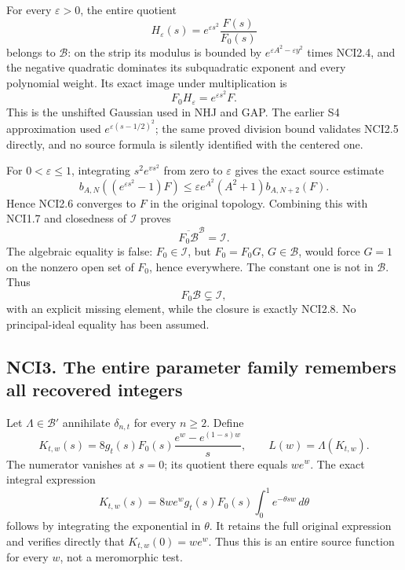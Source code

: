 For every \(\varepsilon>0\), the entire quotient \[
H_\varepsilon(s)=e^{\varepsilon s^2}\frac{F(s)}{F_0(s)}
\tag{NCI2.5}
\] belongs to \(\mathcal B\): on the strip its modulus is bounded by
\(e^{\varepsilon A^2-\varepsilon y^2}\) times NCI2.4, and the negative
quadratic dominates its subquadratic exponent and every polynomial
weight. Its exact image under multiplication is \[
F_0H_\varepsilon=e^{\varepsilon s^2}F.
\tag{NCI2.6}
\] This is the unshifted Gaussian used in NHJ and GAP. The earlier S4
approximation used \(e^{\varepsilon(s-1/2)^2}\); the same proved
division bound validates NCI2.5 directly, and no source formula is
silently identified with the centered one.

For \(0<\varepsilon\le1\), integrating \(s^2e^{v s^2}\) from zero to
\(\varepsilon\) gives the exact source estimate \[
b_{A,N}((e^{\varepsilon s^2}-1)F)
\le\varepsilon e^{A^2}(A^2+1)b_{A,N+2}(F).
\tag{NCI2.7}
\] Hence NCI2.6 converges to \(F\) in the original topology. Combining
this with NCI1.7 and closedness of \(\mathcal I\) proves \[
\boxed{\overline{F_0\mathcal B}^{\mathcal B}=\mathcal I.}
\tag{NCI2.8}
\] The algebraic equality is false: \(F_0\in\mathcal I\), but
\(F_0=F_0G\), \(G\in\mathcal B\), would force \(G=1\) on the nonzero
open set of \(F_0\), hence everywhere. The constant one is not in
\(\mathcal B\). Thus \[
F_0\mathcal B\subsetneq\mathcal I,
\tag{NCI2.9}
\] with an explicit missing element, while the closure is exactly
NCI2.8. No principal-ideal equality has been assumed.

\subsection{NCI3. The entire parameter family remembers all recovered
integers}\label{nci3.-the-entire-parameter-family-remembers-all-recovered-integers}

Let \(\Lambda\in\mathcal B'\) annihilate \(\delta_{n,t}\) for every
\(n\ge2\). Define \[
K_{t,w}(s)=8g_t(s)F_0(s)
\frac{e^w-e^{(1-s)w}}s,
\qquad L(w)=\Lambda(K_{t,w}).
\tag{NCI3.1}
\] The numerator vanishes at \(s=0\); its quotient there equals
\(we^w\). The exact integral expression \[
K_{t,w}(s)=8we^w g_t(s)F_0(s)\int_0^1e^{-\theta sw}\,d\theta
\tag{NCI3.1a}
\] follows by integrating the exponential in \(\theta\). It retains the
full original expression and verifies directly that \(K_{t,w}(0)=we^w\).
Thus this is an entire source function for every \(w\), not a
meromorphic test.

